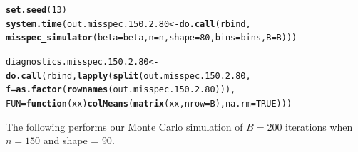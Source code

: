 \documentclass[11pt]{article}\usepackage[]{graphicx}\usepackage[]{color}
\makeatletter
\newcommand{\hlnum}[1]{\textcolor[rgb]{0.686,0.059,0.569}{#1}}%
\newcommand{\hlstd}[1]{\textcolor[rgb]{0.345,0.345,0.345}{#1}}%
\newcommand{\hlkwa}[1]{\textcolor[rgb]{0.161,0.373,0.58}{\textbf{#1}}}%
\newcommand{\hlkwb}[1]{\textcolor[rgb]{0.69,0.353,0.396}{#1}}%
\newcommand{\hlkwc}[1]{\textcolor[rgb]{0.333,0.667,0.333}{#1}}%
\newcommand{\hlkwd}[1]{\textcolor[rgb]{0.737,0.353,0.396}{\textbf{#1}}}%
\newenvironment{kframe}{%
 \def\at@end@of@kframe{}%
 \ifinner\ifhmode%
  \def\at@end@of@kframe{\end{minipage}}%
  \begin{minipage}{\columnwidth}%
 \fi\fi%
 \def\FrameCommand##1{\hskip\@totalleftmargin \hskip-\fboxsep
 \colorbox{shadecolor}{##1}\hskip-\fboxsep
     \hskip-\linewidth \hskip-\@totalleftmargin \hskip\columnwidth}%
 \MakeFramed {\advance\hsize-\width
   \@totalleftmargin\z@ \linewidth\hsize
   \@setminipage}}%
 {\par\unskip\endMakeFramed%
 \at@end@of@kframe}
\newenvironment{knitrout}{}{} %
\makeatother
\begin{document}
\begin{knitrout}
\color{fgcolor}\begin{kframe}
\begin{alltt}
\hlkwd{set.seed}\hlstd{(}\hlnum{13}\hlstd{)}
\hlkwd{system.time}\hlstd{(out.misspec.150.2.80} \hlkwb{<-} \hlkwd{do.call}\hlstd{(rbind,}
  \hlkwd{misspec_simulator}\hlstd{(}\hlkwc{beta} \hlstd{= beta,} \hlkwc{n} \hlstd{= n,} \hlkwc{shape} \hlstd{=} \hlnum{80}\hlstd{,} \hlkwc{bins} \hlstd{= bins,} \hlkwc{B} \hlstd{= B)))}
\end{alltt}


{\ttfamily\noindent\bfseries\color{errorcolor}{\#\# Error in chol.default(crossprod(x) + lambda[j] * diag(v)): the leading minor of order 5 is not positive definite}}

{\ttfamily\noindent\itshape\color{messagecolor}{\#\# Timing stopped at: 0.712 0 0.712}}\begin{alltt}
\hlstd{diagnostics.misspec.150.2.80} \hlkwb{<-} \hlkwd{do.call}\hlstd{(rbind,} \hlkwd{lapply}\hlstd{(}\hlkwd{split}\hlstd{(out.misspec.150.2.80,}
  \hlkwc{f} \hlstd{=} \hlkwd{as.factor}\hlstd{(}\hlkwd{rownames}\hlstd{(out.misspec.150.2.80))),}
  \hlkwc{FUN} \hlstd{=} \hlkwa{function}\hlstd{(}\hlkwc{xx}\hlstd{)} \hlkwd{colMeans}\hlstd{(}\hlkwd{matrix}\hlstd{(xx,} \hlkwc{nrow} \hlstd{= B),} \hlkwc{na.rm} \hlstd{=} \hlnum{TRUE}\hlstd{)))}
\end{alltt}


{\ttfamily\noindent\bfseries\color{errorcolor}{\#\# Error in split(out.misspec.150.2.80, f = as.factor(rownames(out.misspec.150.2.80))): object 'out.misspec.150.2.80' not found}}\end{kframe}
\end{knitrout}


The following performs our Monte Carlo simulation of $B = 200$ iterations 
when $n = 150$ and shape = $90$.
\end{document}
